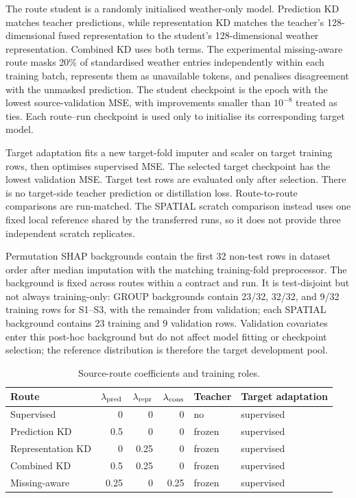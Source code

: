 \documentclass[runningheads]{venue/lncs/llncs}
\begin{document}
The route student is a randomly initialised weather-only model. Prediction KD matches teacher predictions, while representation KD matches the teacher's 128-dimensional fused representation to the student's 128-dimensional weather representation. Combined KD uses both terms. The experimental missing-aware route masks 20\% of standardised weather entries independently within each training batch, represents them as unavailable tokens, and penalises disagreement with the unmasked prediction. The student checkpoint is the epoch with the lowest source-validation MSE, with improvements smaller than $10^{-8}$ treated as ties. Each route--run checkpoint is used only to initialise its corresponding target model.

Target adaptation fits a new target-fold imputer and scaler on target training rows, then optimises supervised MSE. The selected target checkpoint has the lowest validation MSE. Target test rows are evaluated only after selection. There is no target-side teacher prediction or distillation loss. Route-to-route comparisons are run-matched. The SPATIAL scratch comparison instead uses one fixed local reference shared by the transferred runs, so it does not provide three independent scratch replicates.

Permutation SHAP backgrounds contain the first 32 non-test rows in dataset order after median imputation with the matching training-fold preprocessor. The background is fixed across routes within a contract and run. It is test-disjoint but not always training-only: GROUP backgrounds contain 23/32, 32/32, and 9/32 training rows for S1--S3, with the remainder from validation; each SPATIAL background contains 23 training and 9 validation rows. Validation covariates enter this post-hoc background but do not affect model fitting or checkpoint selection; the reference distribution is therefore the target development pool.

\begin{table}[h]
\centering
\caption{Source-route coefficients and training roles.}
\small
\begin{tabular}{lrrrll}
\toprule
Route & $\lambda_{\rm pred}$ & $\lambda_{\rm repr}$ & $\lambda_{\rm cons}$ & Teacher & Target adaptation\\
\midrule
Supervised & 0 & 0 & 0 & no & supervised\\
Prediction KD & 0.5 & 0 & 0 & frozen & supervised\\
Representation KD & 0 & 0.25 & 0 & frozen & supervised\\
Combined KD & 0.5 & 0.25 & 0 & frozen & supervised\\
Missing-aware & 0.25 & 0 & 0.25 & frozen & supervised\\
\bottomrule
\end{tabular}
\end{table}
\end{document}
